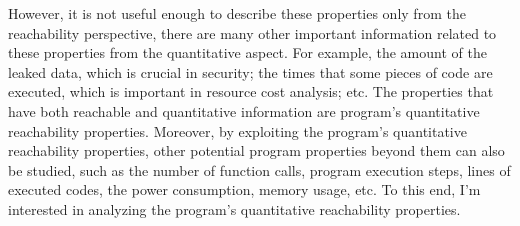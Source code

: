 However, it is not useful enough to describe these properties only
from the reachability perspective,
there are many other
important information related to these properties from the quantitative aspect.
For example, the amount of the leaked data, which is crucial in security;
the times that some pieces of code are executed, which is important in resource cost analysis; etc.
The properties that have both reachable and quantitative information are
program's quantitative reachability properties.
Moreover, 
by exploiting the program's quantitative reachability properties,
other potential program properties beyond them can also be 
studied,
such as the number of function calls,
program execution steps,
lines of executed codes,
the power consumption, memory usage, etc. 
To this end, I'm interested in
analyzing the program's quantitative reachability properties.
